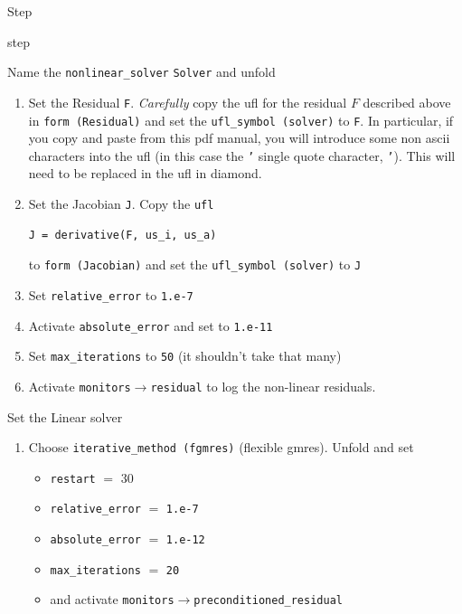 \begin{steps}{Step}
\begin{steps}{step}
\begin{enumerate}
    \end{enumerate}
  \item Name the \texttt{nonlinear\_solver} \texttt{Solver} and unfold
    \begin{enumerate}
    \item Set the Residual \texttt{F}.  \emph{Carefully} copy the ufl for the
      residual $F$ described
      above in \texttt{form (Residual)} and set the
      \texttt{ufl\_symbol (solver)} to \texttt{F}.  In particular, if
      you copy and paste from this pdf manual, you will introduce some
      non ascii characters into the ufl (in this case the \texttt{'}
      single quote character,  \texttt{'}).  This will need to be
      replaced in the ufl in diamond.
    \item Set the Jacobian \texttt{J}.  Copy the \texttt{ufl}
      \begin{lstlisting}[style=UFL]
        J = derivative(F, us_i, us_a)
      \end{lstlisting}
      to \texttt{form (Jacobian)} and set the \texttt{ufl\_symbol
        (solver)} to \texttt{J}
    \item Set \texttt{relative\_error} to \texttt{1.e-7}
    \item Activate \texttt{absolute\_error} and set to \texttt{1.e-11}
    \item Set \texttt{max\_iterations} to \texttt{50} (it shouldn't
      take that many)
    \item Activate \texttt{monitors}$\rightarrow$\texttt{residual} to
      log the non-linear residuals.
    \end{enumerate}
  \item Set the Linear solver
    \begin{enumerate}
    \item Choose \texttt{iterative\_method (fgmres)} (flexible
      gmres). Unfold and set
      \begin{itemize}
      \item \texttt{restart} $=$ 30
      \item \texttt{relative\_error} $=$ \texttt{1.e-7}
      \item \texttt{absolute\_error} $=$  \texttt{1.e-12}
      \item \texttt{max\_iterations} $=$  \texttt{20}
      \item and activate \texttt{monitors}$\rightarrow$\texttt{preconditioned\_residual}
      \end{itemize}


\end{enumerate}
\end{steps}
\end{steps}
